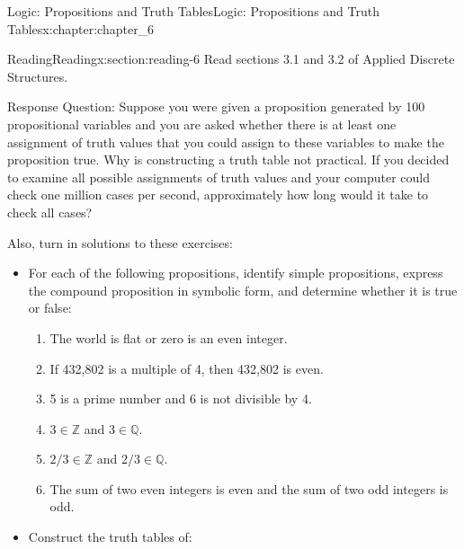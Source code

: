 \documentclass[oneside,10pt,]{book}
\numberwithin{equation}{section}
\begin{document}
%
%
\typeout{************************************************}
\typeout{************************************************}
%
\begin{chapterptx}{Logic: Propositions and Truth Tables}{}{Logic: Propositions and Truth Tables}{}{}{x:chapter:chapter_6}
%
%
%
\typeout{************************************************}
\typeout{************************************************}
%
\begin{sectionptx}{Reading}{}{Reading}{}{}{x:section:reading-6}
Read sections 3.1 and 3.2 of Applied Discrete Structures.%
\par
Response Question: Suppose you were given a proposition generated by 100 propositional variables and you are asked whether there is at least one assignment of truth values that you could assign to these variables to make the proposition true. Why is constructing a truth table not practical.  If you decided to examine all possible assignments of truth values and your computer could check one million cases per second, approximately how long would it take to check all cases?%
\par
Also, turn in solutions to these exercises:%
\begin{itemize}[label=\textbullet]
\item{}For each of the following propositions, identify simple propositions, express the compound proposition in symbolic form, and determine whether it is true or false:%
\par
%
\begin{enumerate}[label=(\alph*)]
\item{}The world is flat or zero is an even integer.%
\item{}If 432,802 is a multiple of 4, then 432,802 is even.%
\item{}5 is a prime number and 6 is not divisible by 4.%
\item{}\(3 \in \mathbb{Z}\) and \(3 \in  \mathbb{Q}\).%
\item{}\(2/3 \in  \mathbb{Z}\) and \(2/3 \in  \mathbb{Q}\).%
\item{}The sum of two even integers is even and the sum of two odd integers is odd.%
\end{enumerate}
%
\item{}Construct the truth tables of:%
\begin{multicols}{2}
\begin{enumerate}[label=(\alph*)]

\end{enumerate}
\end{multicols}
\end{itemize}
\end{sectionptx}
\end{chapterptx}
\end{document}
